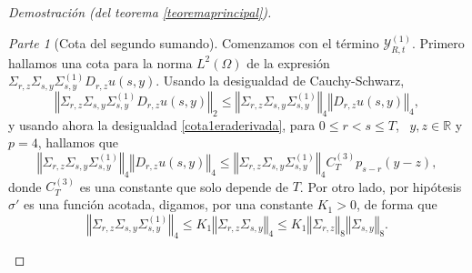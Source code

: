 \documentclass[letterpaper,twoside,12pt]{book}
\newcommand{\R}{\mathbb{R}}
\newcommand{\1}{\mathds{1}}
\newcommand{\norm}[1]{\left\Vert #1 \right\Vert}
\theoremstyle{definition}
\theoremstyle{definition}
\theoremstyle{remark}
\newtheorem{proofpart}{Parte}
\theoremstyle{definition}
\theoremstyle{definition}
\theoremstyle{definition}
\theoremstyle{definition}
\theoremstyle{definition}
\begin{document}
\begin{proof}[Demostración (del teorema \ref{teoremaprincipal})]
\begin{proofpart}[Cota del segundo sumando]
Comenzamos con el término $\mathcal{Y}_{R,t}^{(1)}$. Primero hallamos una cota para la norma $L^2(\Omega)$ de la expresión $\Sigma_{r,z}\Sigma_{s,y}\Sigma_{s,y}^{(1)}D_{r,z}u(s,y)$. Usando la desigualdad de Cauchy-Schwarz, 
\[
   \norm{\Sigma_{r,z}\Sigma_{s,y}\Sigma_{s,y}^{(1)}D_{r,z}u(s,y)}_2\leq \norm{\Sigma_{r,z}\Sigma_{s,y}\Sigma_{s,y}^{(1)}}_4\norm{D_{r,z}u(s,y)}_4, 
\]
y usando ahora la desigualdad \eqref{cota1eraderivada}, para $0\leq r<s\leq T$, \ $y,z\in \R$ y $p=4$, hallamos que 
\begin{equation}\label{pruebacotasigma1}
      \norm{\Sigma_{r,z}\Sigma_{s,y}\Sigma_{s,y}^{(1)}}_4\norm{D_{r,z}u(s,y)}_4\leq \norm{\Sigma_{r,z}\Sigma_{s,y}\Sigma_{s,y}^{(1)}}_4C_{T}^{(3)}p_{s-r}(y-z),   
\end{equation}
donde $C_{T}^{(3)}$ es una constante que solo depende de $T$. Por otro lado, por hipótesis $\sigma'$ es una función acotada, digamos, por una constante $K_1>0$, de forma que 
\begin{equation}\label{pruebacotasigma2}
   \norm{\Sigma_{r,z}\Sigma_{s,y}\Sigma_{s,y}^{(1)}}_4\leq K_1\norm{\Sigma_{r,z}\Sigma_{s,y}}_4\leq K_1\norm{\Sigma_{r,z}}_8\norm{\Sigma_{s,y}}_{8}.
\end{equation}
   

\end{proofpart}
\end{proof}
\end{document}
